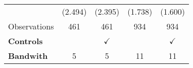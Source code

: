 {\begin{tabular}{lcccc}
						&   \tiny{(2.494)}   &
						    \tiny{(2.395)}   &
						    \tiny{(1.738)}   &
						    \tiny{(1.600)}   \\

Observations				&	461 &
						    461 &
						    934 &
						    934 \\



\midrule

{\bf Controls}  			   		    	 &	      &
										     $\checkmark$ &
										     &
										     $\checkmark$ \\

{\bf Bandwith}  			   		    	 &	5      
											 &  5
											 &  11
										     &  11 \\

\bottomrule

\end{tabular}%
}
